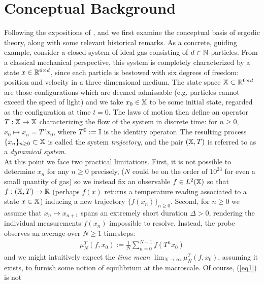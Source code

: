 \documentclass[11pt]{report}
\newcommand{\1}[1]{\mathbbm{1}_{\{#1\}}}
\theoremstyle{definition}
\begin{document}
    \section{Conceptual Background}\label{sec1}
    Following the expositions of \cite[ch.1]{Eisner_Farkas_Haase_Nagel_2015},
    and \cite[ch.2, $\S$5]{Reed_Simon_1972} we first examine the conceptual
    basis of ergodic theory, along with some relevant historical remarks. As a
    concrete, guiding example, consider a closed system of ideal gas consisting
    of $d\in\mathbb{N}$ particles. From a classical mechanical perspective, this
    system is completely characterized by a state $x\in\mathbb{R}^{6\times d}$,
    since each particle is bestowed with six degrees of freedom: position and
    velocity in a three-dimensional medium. The state space
    $\mathbb{X}\subset\mathbb{R}^{6\times d}$ are those configurations which are
    deemed admissable (e.g. particles cannot exceed the speed of light) and we
    take $x_0\in\mathbb{X}$ to be some initial state, regarded as the configuration
    at time $t=0$. The laws of motion then define an operator
    $T:\mathbb{X}\rightarrow\mathbb{X}$ characterizing the flow of the system in
    discrete time: for $n\geq 0$, $x_0\mapsto x_n=T^nx_0$, where $T^0:=\mathbb{I}$
    is the identity operator. The resulting process
    $\{x_n\}_{n\geq0}\subset\mathbb{X}$ is called the system \textit{trajectory},
    and the pair $(\mathbb{X},T)$ is referred to as a \textit{dynamical
    system}.\\[5pt]
    \indent At this point we face two practical limitations. First, it is not
    possible to determine $x_n$ for any $n\geq 0$ precisely, ($N$ could be on
    the order of $10^{23}$ for even a small quantity of gas) so we instead fix
    an observable $f\in L^2(\mathbb{X})$ so that $f:(\mathbb{X},T)\rightarrow\mathbb{R}$
    (perhaps $f(x)$ returns a temperature reading associated to a state
    $x\in\mathbb{X}$) inducing a new trajectory $\{f(x_n)\}_{n\geq 0}$. Second, for
    $n\geq 0$ we assume that $x_n\mapsto x_{n+1}$ spans an extremely short
    duration $\Delta>0$, rendering the individual measurements $f(x_n)$
    impossible to resolve. Instead, the probe observes an average over $N\geq 1$
    timesteps:
    \begin{align}
        \mu_N^T(f,x_0):=\frac{1}{N}\sum_{n=0}^{N-1}f(T^nx_0)\label{eq1}
    \end{align}
    and we might intuitively expect the \textit{time mean}
    $\lim_{N\rightarrow\infty}\mu^T_N(f,x_0)$, assuming it exists, to furnish
    some notion of equilibrium at the macroscale. Of course, (\ref{eq1}) is not
\end{document}
